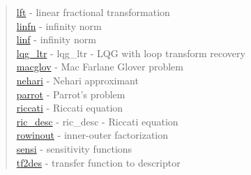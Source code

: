 \begin{quote}
\hyperlink{lft}{lft} - {linear fractional transformation} \\  
\hyperlink{linfn}{linfn} - {infinity norm} \\  
\hyperlink{linf}{linf} - {infinity norm} \\  
\hyperlink{lqg_ltr}{lqg\_ltr} - {lqg_ltr} - {LQG with loop transform recovery} \\  
\hyperlink{macglov}{macglov} - {Mac Farlane Glover problem} \\  
\hyperlink{nehari}{nehari} - {Nehari approximant} \\  
\hyperlink{parrot}{parrot} - {Parrot's problem} \\  
\hyperlink{riccati}{riccati} - {Riccati equation} \\  
\hyperlink{ric_desc}{ric\_desc} - {ric_desc} - {Riccati equation} \\  
\hyperlink{rowinout}{rowinout} - {inner-outer factorization} \\  
\hyperlink{sensi}{sensi} - {sensitivity functions} \\  
\hyperlink{tf2des}{tf2des} - {transfer function to descriptor} \\  
\end{quote}





































 

